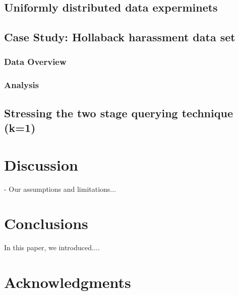 \documentclass{acm_proc_article-sp}
\begin{document}
\subsection{Uniformly distributed data experminets}
\subsection{Case Study: Hollaback harassment data set}
\subsubsection{Data Overview}
\subsubsection{Analysis}
\subsection{Stressing the two stage querying technique (k=1)}

\section{Discussion}
- Our assumptions and limitations...

\section{Conclusions}
In this paper, we introduced.... 

\section{Acknowledgments}


{\footnotesize
}  %
%
%
\end{document}
